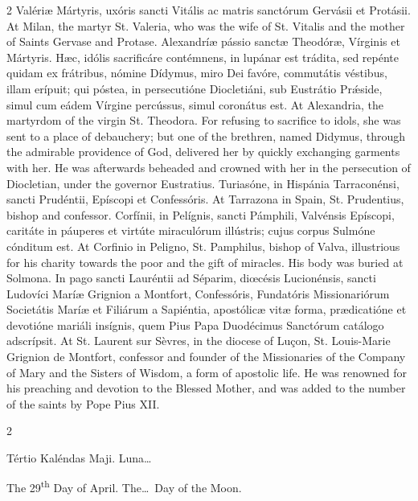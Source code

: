 \begin{paracol}{2}
 Valériæ Mártyris, uxóris sancti Vitális ac matris sanctórum Gervásii et 
 Protásii.
\switchcolumn
{}
At Milan, the martyr St. Valeria, 
 who was the wife of St. Vitalis and the mother of Saints Gervase and Protase.
\switchcolumn*
{}
Alexandríæ pássio 
 sanctæ Theodóræ, Vírginis et Mártyris. Hæc, idólis sacrificáre 
 contémnens, in lupánar est trádita, sed repénte quidam ex frátribus, nómine 
 Dídymus, miro Dei favóre, commutátis véstibus, illam erípuit; qui póstea, in 
 persecutióne Diocletiáni, sub Eustrátio Prǽside, simul cum eádem Vírgine 
 percússus, simul coronátus est.
\switchcolumn
{}
At Alexandria, the martyrdom of the 
 virgin St. Theodora. For refusing to sacrifice to idols, she was sent 
 to a place of debauchery; but one of the brethren, named Didymus, through 
 the admirable providence of God, delivered her by quickly exchanging 
 garments with her. He was afterwards beheaded and crowned with her in 
 the persecution of Diocletian, under the governor Eustratius.
\switchcolumn*
{}
Turiasóne, in Hispánia 
 Tarraconénsi, sancti Prudéntii, Epíscopi et Confessóris.
\switchcolumn
{}
At Tarrazona in Spain, St. 
 Prudentius, bishop and confessor.
\switchcolumn*
{}
Corfínii, in Pelígnis, 
 sancti Pámphili, Valvénsis Epíscopi, caritáte in páuperes et virtúte 
 miraculórum illústris; cujus corpus Sulmóne cónditum est.
\switchcolumn
{}
At Corfinio in Peligno, St. 
 Pamphilus, bishop of Valva, illustrious for his charity towards the poor and 
 the gift of miracles. His body was buried at Solmona.
\switchcolumn*
{}
In pago sancti 
 Lauréntii ad Séparim, diœcésis Lucionénsis, sancti Ludovíci Maríæ Grignion a 
 Montfort, Confessóris, Fundatóris Missionariórum Societátis Maríæ et 
 Filiárum a Sapiéntia, apostólicæ vitæ forma, prædicatióne et devotióne 
 mariáli insígnis, quem Pius Papa Duodécimus Sanctórum catálogo adscrípsit.
\switchcolumn
{}
At St. Laurent sur Sèvres, in the 
 diocese of Luçon, St. Louis-Marie Grignion de Montfort, confessor and 
 founder of the Missionaries of the Company of Mary and the Sisters of 
 Wisdom, a form of apostolic life. He was renowned for his preaching 
 and devotion to the Blessed Mother, and was added to the number of the 
 saints by Pope Pius XII.
\switchcolumn*
{}
\end{paracol}


\begin{paracol}{2}
\begin{center}{\color{gregoriocolor} Tértio Kaléndas Maji. 
 Luna\dots\ }\end{center}
\switchcolumn
{}
\begin{center}{\color{gregoriocolor} The 
 29\textsuperscript{th} Day of April. The\dots\ Day of the Moon.}\end{center}
\end{paracol}

